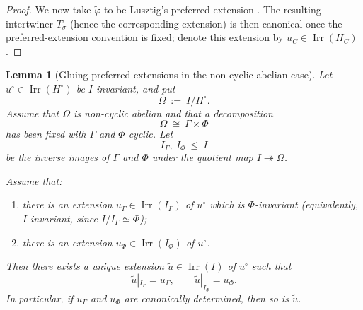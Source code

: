 \documentclass{amsart}
\theoremstyle{plain}
\numberwithin{equation}{section}
\newtheorem{lemma}[theorem]{Lemma}
\theoremstyle{definition}
\newcommand{\Irr}{\operatorname{Irr}}
\begin{document}
\begin{proof}
We now take $\tilde\varphi$ to be Lusztig's preferred extension
\cite[\S17.2--\S17.3]{Lusztig1986character}.  The resulting intertwiner $T_\sigma$ (hence the
corresponding extension) is then canonical once the preferred-extension
convention is fixed; denote this extension by $u_C\in\Irr(H_C)$.

\end{proof}
\begin{lemma}[Gluing preferred extensions in the non-cyclic abelian case]
\label{lem:gluing-preferred-extension-non-cyclic}
Let \(u^\circ\in \Irr(H^\circ)\) be \(I\)-invariant, and put
\[
\Omega \ :=\ I/H^\circ .
\]
Assume that \(\Omega\) is non-cyclic abelian and that a decomposition
\[
\Omega \ \cong\ \Gamma \times \Phi
\]
has been fixed with \(\Gamma\) and \(\Phi\) cyclic. Let
\[
I_\Gamma,\ I_\Phi \ \leq\ I
\]
be the inverse images of \(\Gamma\) and \(\Phi\) under the quotient map
\(I\twoheadrightarrow \Omega\).

Assume that:

\begin{enumerate}
\item there is an extension \(u_\Gamma\in \Irr(I_\Gamma)\) of \(u^\circ\) which is
\(\Phi\)-invariant (equivalently, \(I\)-invariant, since \(I/I_\Gamma\simeq \Phi\));

\item there is an extension \(u_\Phi\in \Irr(I_\Phi)\) of \(u^\circ\).
\end{enumerate}

Then there exists a unique extension \(\widetilde u\in \Irr(I)\) of \(u^\circ\) such that
\[
\widetilde u|_{I_\Gamma}=u_\Gamma,
\qquad
\widetilde u|_{I_\Phi}=u_\Phi.
\]
In particular, if \(u_\Gamma\) and \(u_\Phi\) are canonically determined, then so is
\(\widetilde u\).
\end{lemma}
\end{document}

